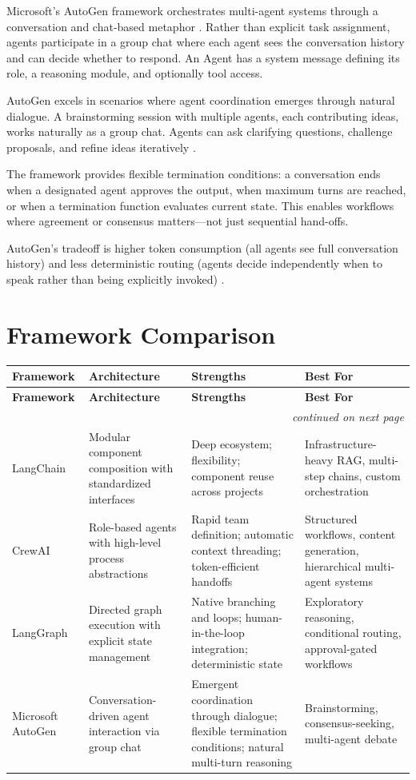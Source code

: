 Microsoft's AutoGen framework orchestrates multi-agent systems through a conversation and chat-based metaphor \cite{AutoGen2023}. Rather than explicit task assignment, agents participate in a group chat where each agent sees the conversation history and can decide whether to respond. An Agent has a system message defining its role, a reasoning module, and optionally tool access.

AutoGen excels in scenarios where agent coordination emerges through natural dialogue. A brainstorming session with multiple agents, each contributing ideas, works naturally as a group chat. Agents can ask clarifying questions, challenge proposals, and refine ideas iteratively \cite{AutoGen2023}.

The framework provides flexible termination conditions: a conversation ends when a designated agent approves the output, when maximum turns are reached, or when a termination function evaluates current state. This enables workflows where agreement or consensus matters---not just sequential hand-offs.

AutoGen's tradeoff is higher token consumption (all agents see full conversation history) and less deterministic routing (agents decide independently when to speak rather than being explicitly invoked) \cite{Segal2026}.

\section{Framework Comparison}

\begin{longtable}{@{}p{2.5cm}p{3.5cm}p{3.8cm}p{4.0cm}@{}}
\toprule
\textbf{Framework} & \textbf{Architecture} & \textbf{Strengths} & \textbf{Best For} \\
\midrule
\endfirsthead
\toprule
\textbf{Framework} & \textbf{Architecture} & \textbf{Strengths} & \textbf{Best For} \\
\midrule
\endhead
\midrule
\multicolumn{4}{r}{\textit{continued on next page}} \\
\endfoot
\bottomrule
\endlastfoot
LangChain & Modular component composition with standardized interfaces & Deep ecosystem; flexibility; component reuse across projects & Infrastructure-heavy RAG, multi-step chains, custom orchestration \\[8pt]
CrewAI & Role-based agents with high-level process abstractions & Rapid team definition; automatic context threading; token-efficient handoffs & Structured workflows, content generation, hierarchical multi-agent systems \\[8pt]
LangGraph & Directed graph execution with explicit state management & Native branching and loops; human-in-the-loop integration; deterministic state & Exploratory reasoning, conditional routing, approval-gated workflows \\[8pt]
Microsoft AutoGen & Conversation-driven agent interaction via group chat & Emergent coordination through dialogue; flexible termination conditions; natural multi-turn reasoning & Brainstorming, consensus-seeking, multi-agent debate \\[8pt]
\end{longtable}

